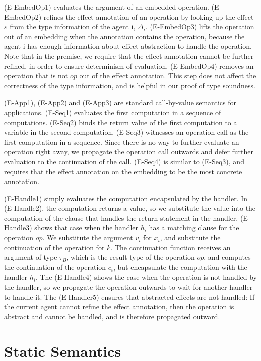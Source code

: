 (E-EmbedOp1) evaluates the argument of an embedded operation. (E-EmbedOp2) refines the effect annotation of an operation by looking up the effect $\varepsilon$ from the type information of the agent i, $\Delta_i$. (E-EmbedOp3) lifts the operation out of an embedding when the annotation contains the operation, because the agent i has enough information about effect abstraction to handle the operation. Note that in the premise, we require that the effect annotation cannot be further refined, in order to ensure determinism of evaluation. (E-EmbedOp4) removes an operation that is not $op$ out of the effect annotation. This step does not affect the correctness of the type information, and is helpful in our proof of type soundness.

(E-App1), (E-App2) and (E-App3) are standard call-by-value semantics for applications. (E-Seq1) evaluates the first computation in a sequence of computations. (E-Seq2) binds the return value of the first computation to a variable in the second computation. (E-Seq3) witnesses an operation call as the first computation in a sequence. Since there is no way to further evaluate an operation right away, we propagate the operation call outwards and defer further evaluation to the continuation of the call. (E-Seq4) is similar to (E-Seq3), and requires that the effect annotation on the embedding to be the most concrete annotation. 

(E-Handle1) simply evaluates the computation encapsulated by the handler. In (E-Handle2), the computation returns a value, so we substitute the value into the computation of the clause that handles the return statement in the handler. (E-Handle3) shows that case when the handler $h_i$ has a matching clause for the operation $op$. We substitute the argument $v_i$ for $x_i$, and substitute the continuation of the operation for $k$. The continuation function receives an argument of type $\tau_B$, which is the result type of the operation $op$, and computes the continuation of the operation $c_i$, but encapsulate the computation with the handler $h_i$. The (E-Handle4) shows the case when the operation is not handled by the handler, so we propagate the operation outwards to wait for another handler to handle it. The (E-Handler5) ensures that abstracted effects are not handled: If the current agent cannot refine the effect annotation, then the operation is abstract and cannot be handled, and is therefore propagated outward. 



\section{Static Semantics}
